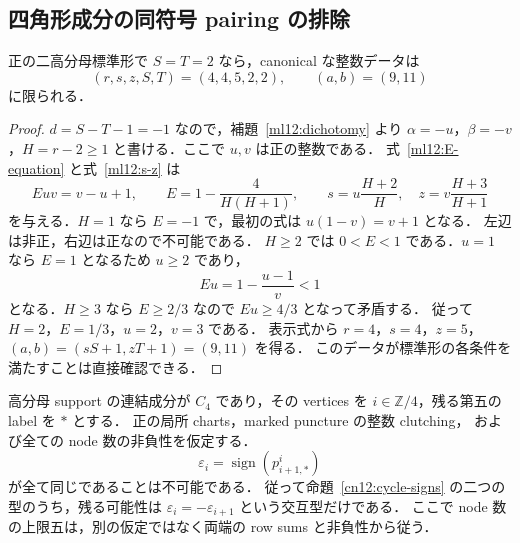 
\subsection{四角形成分の同符号 pairing の排除}
\label{cq12:section}

\begin{lemma}
\label{cq13:reverse-two}
正の二高分母標準形で $S=T=2$ なら，canonical な整数データは
\[
 (r,s,z,S,T)=(4,4,5,2,2),\qquad (a,b)=(9,11)
\]
に限られる．
\end{lemma}

\begin{proof}
$d=S-T-1=-1$ なので，補題~\ref{ml12:dichotomy} より
$\alpha=-u$，$\beta=-v$，$H=r-2\geq1$ と書ける．ここで $u,v$ は正の整数である．
式~\eqref{ml12:E-equation} と式~\eqref{ml12:s-z} は
\[
 Euv=v-u+1,\qquad E=1-\frac4{H(H+1)},\qquad
 s=u\frac{H+2}{H},\quad z=v\frac{H+3}{H+1}
\]
を与える．$H=1$ なら $E=-1$ で，最初の式は $u(1-v)=v+1$ となる．
左辺は非正，右辺は正なので不可能である．
$H\geq2$ では $0<E<1$ である．$u=1$ なら $E=1$ となるため $u\geq2$ であり，
\[
 Eu=1-\frac{u-1}{v}<1
\]
となる．$H\geq3$ なら $E\geq2/3$ なので $Eu\geq4/3$ となって矛盾する．
従って $H=2$，$E=1/3$，$u=2$，$v=3$ である．
表示式から $r=4$，$s=4$，$z=5$，$(a,b)=(sS+1,zT+1)=(9,11)$ を得る．
このデータが標準形の各条件を満たすことは直接確認できる．
\end{proof}

\begin{theorem}\label{cq12:no-constant-pairing}
\label{cq13:no-constant-pairing}
高分母 support の連結成分が $C_4$ であり，その vertices を
$i\in\mathbb Z/4$，残る第五の label を $*$ とする．
正の局所 charts，marked puncture の整数 clutching，
および全ての node 数の非負性を仮定する．
\[
 \varepsilon_i=\operatorname{sign}(p^i_{i+1,*})
\]
が全て同じであることは不可能である．
従って命題~\ref{cn12:cycle-signs} の二つの型のうち，残る可能性は
$\varepsilon_i=-\varepsilon_{i+1}$ という交互型だけである．
ここで node 数の上限五は，別の仮定ではなく両端の row sums と非負性から従う．
\end{theorem}

